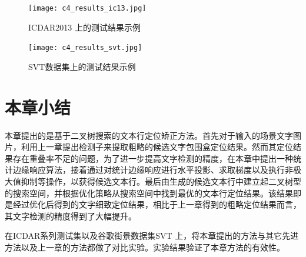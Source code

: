         \begin{figure}[!h]
        \centering
        \texttt{[image: c4\_results\_ic13.jpg]}
        \caption{ICDAR2013 上的测试结果示例}
        \label{fig.c4_results_ic13}
        \end{figure}

        \begin{figure}[!h]
        \centering
        \texttt{[image: c4\_results\_svt.jpg]}
        \caption{SVT数据集上的测试结果示例}
        \label{fig.c4_results_svt}
        \end{figure}


    \section{本章小结}

    本章提出的是基于二叉树搜索的文本行定位矫正方法。首先对于输入的场景文字图片，利用上一章提出检测子来提取粗略的候选文字包围盒定位结果。然而其定位结果存在重叠率不足的问题，为了进一步提高文字检测的精度，在本章中提出一种统计边缘响应算法，接着通过对统计边缘响应进行水平投影、求取梯度以及执行非极大值抑制等操作，以获得候选文本行。最后由生成的候选文本行中建立起二叉树型的搜索空间，并根据优化策略从搜索空间中找到最优的文本行定位结果。该结果即是经过优化后得到的文字细致定位结果，相比于上一章得到的粗略定位结果而言，其文字检测的精度得到了大幅提升。

    在ICDAR系列测试集以及谷歌街景数据集SVT 上，将本章提出的方法与其它先进方法以及上一章的方法都做了对比实验。实验结果验证了本章方法的有效性。


